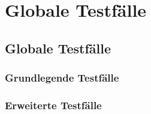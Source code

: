 \documentclass[a4paper,12pt]{article}
\begin{document}
\section{Globale Testfälle}
\subsection{Globale Testfälle}
\subsubsection{Grundlegende Testfälle}
\subsubsection{Erweiterte Testfälle}

\clearpage
\printnoidxglossaries
\end{document}
